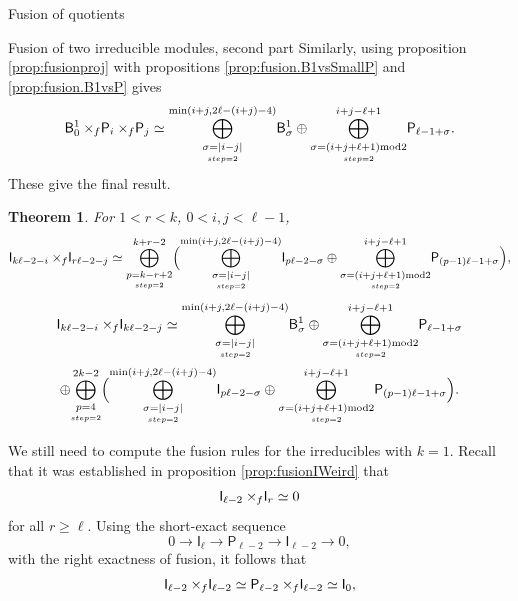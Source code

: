 \documentclass[reqno]{amsart}
\newtheorem{Thm}{Theorem}[section]
\newcommand{\dl}[1]{\mathsf I_{#1}}
\newcommand{\dP}[1]{\mathsf P_{#1}}
\newcommand{\xf}{\times\hspace{-0.27em}_f}
\newcommand{\B}[2]{\mathsf{B}^{#1}_{#2}}
\newcommand{\lc}{\ell}
\begin{document}
\begin{section}{Fusion of quotients}
\begin{subsection}{Fusion of two irreducible modules, second part}
Similarly, using proposition \ref{prop:fusionproj} with propositions \ref{prop:fusion.B1vsSmallP} and \ref{prop:fusion.B1vsP} gives
\begin{equation}
\B{1}{0} \xf  \dP{i} \xf \dP{j} \simeq \overset{\min(i+j,2\lc-(i+j)-4)}{\underset{\underset{step=2}{\sigma = |i-j|}}{\bigoplus}}\B{1}{\sigma} \oplus \overset{i+j -\lc+1}{\underset{\underset{step=2}{\sigma =(i+j+\lc+1)\text{mod} 2 }}{\bigoplus}}\dP{\lc -1 +\sigma}.
\end{equation}
These give the final result.
\begin{Thm}
For $1<r< k$, $0<i,j<\lc-1$,
\begin{equation}
\dl{k\lc -2-i} \xf \dl{r \lc -2-j} \simeq \overset{k+r-2}{\underset{\underset{step=2}{p=k-r+2}}{\bigoplus}}\Big( \overset{\min(i+j,2\lc-(i+j)-4)}{\underset{\underset{step=2}{\sigma = |i-j|}}{\bigoplus}}\dl{p \lc -2 - \sigma} \oplus \overset{i+j -\lc+1}{\underset{\underset{step=2}{\sigma =(i+j+\lc+1)\text{mod} 2 }}{\bigoplus}}\dP{(p-1)\lc -1 +\sigma} \Big),
\end{equation}
\begin{multline}
\dl{k \lc -2 -i} \xf \dl{k \lc -2 -j} \simeq \overset{\min(i+j,2\lc-(i+j)-4)}{\underset{\underset{step=2}{\sigma = |i-j|}}{\bigoplus}}\B{1}{\sigma} \oplus \overset{i+j -\lc+1}{\underset{\underset{step=2}{\sigma =(i+j+\lc+1)\text{mod} 2 }}{\bigoplus}}\dP{\lc -1 +\sigma} \\
\oplus \overset{2k-2}{\underset{\underset{step=2}{p=4}}{\bigoplus}}\Big( \overset{\min(i+j,2\lc-(i+j)-4)}{\underset{\underset{step=2}{\sigma = |i-j|}}{\bigoplus}}\dl{p \lc -2 - \sigma} \oplus \overset{i+j -\lc+1}{\underset{\underset{step=2}{\sigma =(i+j+\lc+1)\text{mod} 2 }}{\bigoplus}}\dP{(p-1)\lc -1 +\sigma} \Big).
\end{multline}
\end{Thm}
We still need to compute the fusion rules for the irreducibles with $k=1$. Recall that it was established in proposition \ref{prop:fusionIWeird} that 
\begin{equation*}
\dl{\lc -2} \xf \dl{r} \simeq 0
\end{equation*}
for all $r\geq \lc$. Using the short-exact sequence
\begin{equation*}
0 \longrightarrow \dl{\lc} \longrightarrow \dP{\lc -2} \longrightarrow \dl{\lc -2} \longrightarrow 0,
\end{equation*}
with the right exactness of fusion, it follows that
\begin{equation}
\dl{\lc -2} \xf \dl{\lc -2} \simeq \dP{\lc -2} \xf \dl{\lc -2} \simeq \dl{0},

\end{equation}
\end{subsection}
\end{section}
\end{document}

